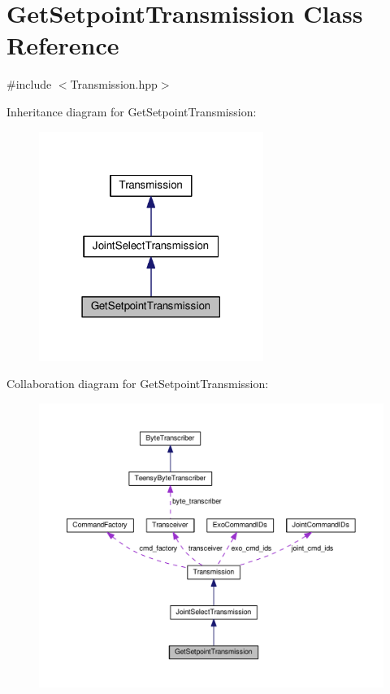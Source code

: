 \hypertarget{classGetSetpointTransmission}{}\section{Get\+Setpoint\+Transmission Class Reference}
\label{classGetSetpointTransmission}


{\ttfamily \#include $<$Transmission.\+hpp$>$}



Inheritance diagram for Get\+Setpoint\+Transmission\+:\nopagebreak
\begin{figure}[H]
\begin{center}
\leavevmode
\includegraphics[width=207pt]{classGetSetpointTransmission__inherit__graph}
\end{center}
\end{figure}


Collaboration diagram for Get\+Setpoint\+Transmission\+:
\nopagebreak
\begin{figure}[H]
\begin{center}
\leavevmode
\includegraphics[width=350pt]{classGetSetpointTransmission__coll__graph}
\end{center}
\end{figure}
